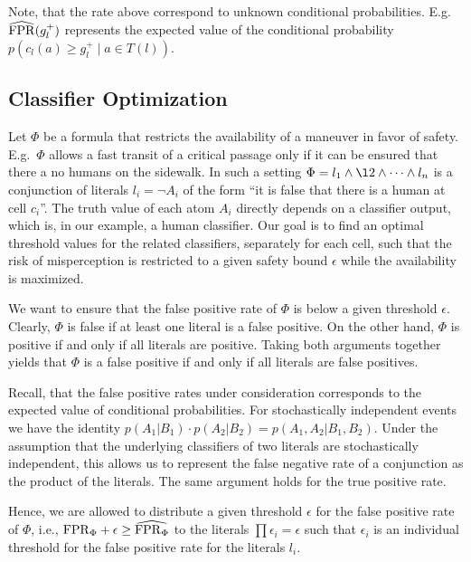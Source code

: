 Note, that the rate above correspond to unknown conditional probabilities. E.g.\
$\widehat{\mathrm{FPR}}(g_l^+)$ represents the expected value of the conditional probability $p( c_l(a)\geq g_l^+ \mid a\in T(l))$.

\subsection{Classifier Optimization}
Let $\Phi$ be a formula that restricts the availability of a maneuver in favor of safety. 
E.g.\ $\Phi$ allows a fast transit of a critical passage only if it can be ensured that there a no humans on the sidewalk. In such a setting $\Phi = l_1 \land \l2 \land \dots \land l_n$ is a conjunction of literals $l_i=\lnot A_i$ of the form ``it is false that there is a human at cell $c_i$''. The truth value of each atom $A_i$ directly depends on a classifier output, which is, in our example, a human classifier. Our goal is to find an optimal threshold values for the related classifiers, separately for each cell,
such that the risk of misperception is restricted to a given safety bound
$\epsilon$ while the availability is maximized.

We want to ensure that the false positive rate of $\Phi$ is below a
given threshold $\epsilon$. Clearly, $\Phi$ is false if at least one literal
is a false positive. On the other hand, $\Phi$ is positive if and only if
all literals are positive. Taking both arguments together yields that
$\Phi$ is a false positive if and only if all literals are false positives.

Recall, that the false positive rates under consideration corresponds
to the expected value of conditional probabilities.
For stochastically independent events we have the identity 
$p(A_1|B_1)\cdot p(A_2|B_2) = p(A_1,A_2|B_1,B_2)$. Under the assumption that
the underlying classifiers of two literals are stochastically independent,
this allows us to represent the false negative rate of a conjunction as the
product of the literals. The same argument holds for the true positive rate.

Hence, we are allowed to distribute a given threshold $\epsilon$ for the
false positive rate of $\Phi$, i.e., $\mathrm{FPR}_\Phi+\epsilon\geq\widehat{\mathrm{FPR}_\Phi}$ to the literals $\prod\epsilon_i = \epsilon$ such that $\epsilon_i$
is an individual threshold for the false positive rate for the literals $l_i$.

%



